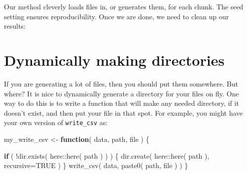 \documentclass[
]{book}
\newenvironment{Shaded}{\begin{snugshade}}{\end{snugshade}}
\newcommand{\AttributeTok}[1]{\textcolor[rgb]{0.77,0.63,0.00}{#1}}
\newcommand{\CommentTok}[1]{\textcolor[rgb]{0.56,0.35,0.01}{\textit{#1}}}
\newcommand{\ConstantTok}[1]{\textcolor[rgb]{0.00,0.00,0.00}{#1}}
\newcommand{\ControlFlowTok}[1]{\textcolor[rgb]{0.13,0.29,0.53}{\textbf{#1}}}
\newcommand{\DecValTok}[1]{\textcolor[rgb]{0.00,0.00,0.81}{#1}}
\newcommand{\FunctionTok}[1]{\textcolor[rgb]{0.00,0.00,0.00}{#1}}
\newcommand{\NormalTok}[1]{#1}
\newcommand{\OtherTok}[1]{\textcolor[rgb]{0.56,0.35,0.01}{#1}}
\newcommand{\SpecialCharTok}[1]{\textcolor[rgb]{0.00,0.00,0.00}{#1}}
\newcommand{\StringTok}[1]{\textcolor[rgb]{0.31,0.60,0.02}{#1}}
\begin{document}
Our method cleverly loads files in, or generates them, for each chunk.
The seed setting ensures reproducibility.
Once we are done, we need to clean up our results:

\begin{Shaded}
\end{Shaded}

\hypertarget{dynamically-making-directories}{%
\section{Dynamically making directories}\label{dynamically-making-directories}}

If you are generating a lot of files, then you should put them somewhere.
But where?
It is nice to dynamically generate a directory for your files on fly.
One way to do this is to write a function that will make any needed directory, if it doesn't exist, and then put your file in that spot.
For example, you might have your own version of \texttt{write\_csv} as:

\begin{Shaded}
\begin{Highlighting}[]
\NormalTok{my\_write\_csv }\OtherTok{\textless{}{-}} \ControlFlowTok{function}\NormalTok{( data, path, file ) \{}
  
  \ControlFlowTok{if}\NormalTok{ ( }\SpecialCharTok{!}\FunctionTok{dir.exists}\NormalTok{( here}\SpecialCharTok{::}\FunctionTok{here}\NormalTok{( path ) ) ) \{}
    \FunctionTok{dir.create}\NormalTok{( here}\SpecialCharTok{::}\FunctionTok{here}\NormalTok{( path ), }\AttributeTok{recursive=}\ConstantTok{TRUE}\NormalTok{ ) }
\NormalTok{  \}}
  \FunctionTok{write\_csv}\NormalTok{( data, }\FunctionTok{paste0}\NormalTok{( path, file ) )}
\NormalTok{\}}
\end{Highlighting}
\end{Shaded}
\end{document}
